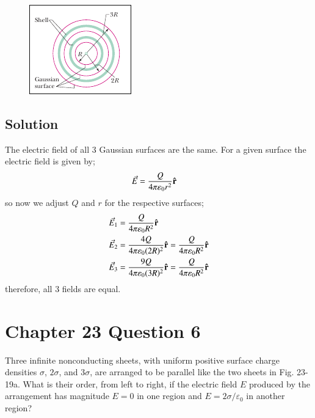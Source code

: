 \documentclass{article}
\begin{document}
\begin{figure}[ht]
    \centering
    \includegraphics[scale=0.75]{image.png}
\end{figure}

\subsection*{Solution}
The electric field of all 3 Gaussian surfaces are the same. For a given surface the electric field is given by;
\begin{align*}
    \vec{E} &= \frac{Q}{4\pi \varepsilon_0 r^2} \vu r
\end{align*}
so now we adjust $Q$ and $r$ for the respective surfaces;
\begin{align*}
    \vec{E}_1 &= \frac{Q}{4\pi \varepsilon_0 R^2} \vu r \\
    \vec{E}_2 &= \frac{4Q}{4\pi \varepsilon_0 (2R)^2} \vu r  = \frac{Q}{4\pi \varepsilon_0 R^2} \vu r \\
    \vec{E}_3 &= \frac{9Q}{4\pi \varepsilon_0 (3R)^2} \vu r = \frac{Q}{4\pi \varepsilon_0 R^2} \vu r
\end{align*}
therefore, all 3 fields are equal.

\section*{Chapter 23 Question 6}
Three infinite nonconducting sheets, with uniform positive surface charge densities $\sigma$, $2\sigma$, and $3\sigma$, are arranged to be parallel like the two sheets in Fig. 23-19a. What is their order, from left to right, if the electric field $E$ produced by the arrangement has magnitude $E = 0$ in one region and $E = 2\sigma/\varepsilon_0$ in another region?
\end{document}
